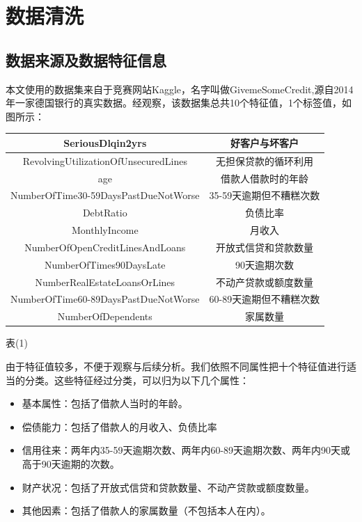 \documentclass[12pt]{article}
\begin{document}
\newpage
\section{数据清洗}

\subsection{数据来源及数据特征信息}
本文使用的数据集来自于竞赛网站Kaggle，名字叫做GivemeSomeCredit,源自2014年一家德国银行的真实数据。经观察，该数据集总共10个特征值，1个标签值，如图所示：

\vspace{2cm}

\begin{tabular}{|c|c|}
	\hline 
	SeriousDlqin2yrs & 好客户与坏客户 \\ 
	\hline 
	RevolvingUtilizationOfUnsecuredLines & 无担保贷款的循环利用 \\ 
	\hline 
	age  & 借款人借款时的年龄 \\ 
	\hline 
	NumberOfTime30-59DaysPastDueNotWorse & 35-59天逾期但不糟糕次数 \\ 
	\hline 
	DebtRatio  & 负债比率 \\ 
	\hline 
	MonthlyIncome & 月收入 \\ 
	\hline 
	NumberOfOpenCreditLinesAndLoans & 开放式信贷和贷款数量 \\ 
	\hline 
	NumberOfTimes90DaysLate & 90天逾期次数 \\ 
	\hline 
	NumberRealEstateLoansOrLines & 不动产贷款或额度数量 \\ 
	\hline 
	NumberOfTime60-89DaysPastDueNotWorse  & 60-89天逾期但不糟糕次数 \\ 
	\hline 
	NumberOfDependents  & 家属数量 \\ 
	\hline 
\end{tabular} 
\begin{center}
	表(1)
\end{center}
\vspace{2cm}

由于特征值较多，不便于观察与后续分析。我们依照不同属性把十个特征值进行适当的分类。这些特征经过分类，可以归为以下几个属性：
\begin{itemize}
	\item 基本属性：包括了借款人当时的年龄。
	\item 偿债能力：包括了借款人的月收入、负债比率
	\item 信用往来：两年内35-59天逾期次数、两年内60-89天逾期次数、两年内90天或高于90天逾期的次数。
	\item 财产状况：包括了开放式信贷和贷款数量、不动产贷款或额度数量。
	\item 其他因素：包括了借款人的家属数量（不包括本人在内）。
\end{itemize}
\end{document}

